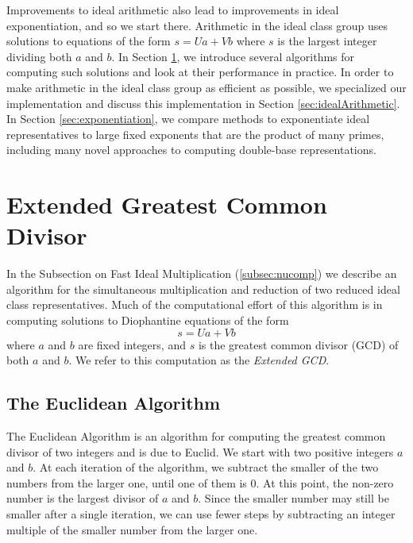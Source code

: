 \documentclass{ucalgthes1}
\theoremstyle{definition}
\begin{document}
Improvements to ideal arithmetic also lead to improvements in ideal exponentiation, and so we start there. Arithmetic in the ideal class group uses solutions to equations of the form $s = Ua + Vb$ where $s$ is the largest integer dividing both $a$ and $b$. In Section \ref{sec:eea}, we introduce several algorithms for computing such solutions and look at their performance in practice. In order to make arithmetic in the ideal class group as efficient as possible, we specialized our implementation and discuss this implementation in Section \ref{sec:idealArithmetic}. In Section \ref{sec:exponentiation}, we compare methods to exponentiate ideal representatives to large fixed exponents that are the product of many primes, including many novel approaches to computing double-base representations.

\section{Extended Greatest Common Divisor}
\label{sec:eea}

In the Subsection on Fast Ideal Multiplication (\ref{subsec:nucomp}) we describe an algorithm for the simultaneous multiplication and reduction of two reduced ideal class representatives.  Much of the computational effort of this algorithm is in computing solutions to Diophantine equations of the form
\[
	s = Ua + Vb
\]
where $a$ and $b$ are fixed integers, and $s$ is the greatest common divisor (GCD) of both $a$ and $b$.  We refer to this computation as the \emph{Extended GCD}.

\subsection{The Euclidean Algorithm}

The Euclidean Algorithm is an algorithm for computing the greatest common divisor of two integers and is due to Euclid.  We start with two positive integers $a$ and $b$.  At each iteration of the algorithm, we subtract the smaller of the two numbers from the larger one, until one of them is 0. At this point, the non-zero number is the largest divisor of $a$ and $b$.  Since the smaller number may still be smaller after a single iteration, we can use fewer steps by subtracting an integer multiple of the smaller number from the larger one.
\end{document}
